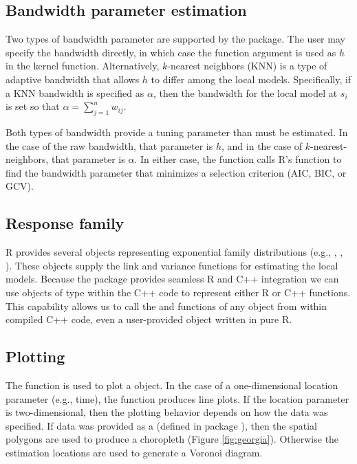 \subsection{Bandwidth parameter estimation}
Two types of bandwidth parameter are supported by the  package. The user may specify the bandwidth directly, in which case the  function argument is used as $h$ in the kernel function. Alternatively,  $k$-nearest neighbors (KNN) is a type of adaptive bandwidth that allows $h$ to differ among the local models. Specifically, if a KNN bandwidth is specified as $\alpha$, then the bandwidth for the local model at $s_i$ is set so that $\alpha = \sum_{j=1}^n w_{ij}$.

Both types of bandwidth provide a tuning parameter than must be estimated. In the case of the raw bandwidth, that parameter is $h$, and in the case of $k$-nearest-neighbors, that parameter is $\alpha$. In either case, the function  calls R's  function to find the bandwidth parameter that minimizes a selection criterion (AIC, BIC, or GCV). 

\subsection{Response family}
R provides several  objects representing exponential family distributions (e.g., , , ). These objects supply the link and variance functions for estimating the local models. Because the  package provides seamless R and C++ integration we can use objects of type  within the C++ code to represent either R or C++ functions. This capability allows us to call the  and  functions of any  object from within compiled C++ code, even a user-provided  object written in pure R.

\subsection{Plotting}
The function  is used to plot a  object. In the case of a one-dimensional location parameter (e.g., time), the function produces line plots. If the location parameter is two-dimensional, then the plotting behavior depends on how the data was specified. If data was provided as a  (defined in package ), then the spatial polygons are used to produce a choropleth (Figure \ref{fig:georgia}). Otherwise the estimation locations are used to generate a Voronoi diagram.

